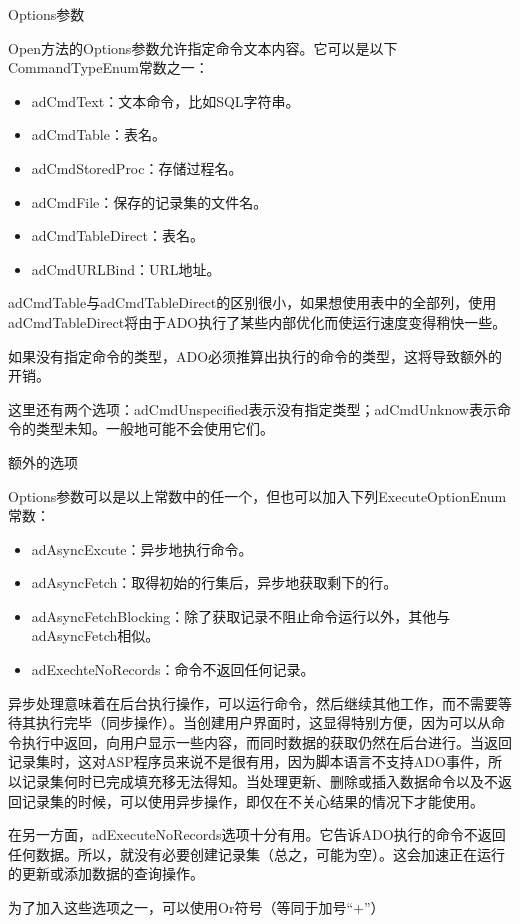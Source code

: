 Options参数

Open方法的Options参数允许指定命令文本内容。它可以是以下CommandTypeEnum常数之一：
\begin{itemize}[]
	\item adCmdText：文本命令，比如SQL字符串。
	\item adCmdTable：表名。
	\item adCmdStoredProc：存储过程名。
	\item adCmdFile：保存的记录集的文件名。
	\item adCmdTableDirect：表名。
	\item adCmdURLBind：URL地址。
\end{itemize}
adCmdTable与adCmdTableDirect的区别很小，如果想使用表中的全部列，使用adCmdTableDirect将由于ADO执行了某些内部优化而使运行速度变得稍快一些。

如果没有指定命令的类型，ADO必须推算出执行的命令的类型，这将导致额外的开销。

这里还有两个选项：adCmdUnspecified表示没有指定类型；adCmdUnknow表示命令的类型未知。一般地可能不会使用它们。

额外的选项

Options参数可以是以上常数中的任一个，但也可以加入下列ExecuteOptionEnum常数：
\begin{itemize}[]
\item adAsyncExcute：异步地执行命令。

\item adAsyncFetch：取得初始的行集后，异步地获取剩下的行。

\item adAsyncFetchBlocking：除了获取记录不阻止命令运行以外，其他与adAsyncFetch相似。

\item  adExechteNoRecords：命令不返回任何记录。
\end{itemize}
异步处理意味着在后台执行操作，可以运行命令，然后继续其他工作，而不需要等待其执行完毕（同步操作）。当创建用户界面时，这显得特别方便，因为可以从命令执行中返回，向用户显示一些内容，而同时数据的获取仍然在后台进行。当返回记录集时，这对ASP程序员来说不是很有用，因为脚本语言不支持ADO事件，所以记录集何时已完成填充移无法得知。当处理更新、删除或插入数据命令以及不返回记录集的时候，可以使用异步操作，即仅在不关心结果的情况下才能使用。

在另一方面，adExecuteNoRecords选项十分有用。它告诉ADO执行的命令不返回任何数据。所以，就没有必要创建记录集（总之，可能为空）。这会加速正在运行的更新或添加数据的查询操作。

为了加入这些选项之一，可以使用Or符号（等同于加号``+''）

